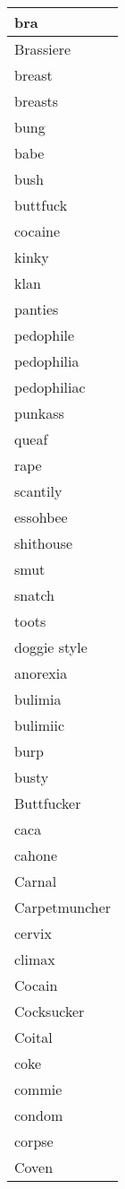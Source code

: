 \begin{longtable}{|l|}
bra \\ \hline 
Brassiere \\ \hline 
breast \\ \hline 
breasts \\ \hline 
bung \\ \hline 
babe \\ \hline 
bush \\ \hline 
buttfuck \\ \hline 
cocaine \\ \hline 
kinky \\ \hline 
klan \\ \hline 
panties \\ \hline 
pedophile \\ \hline 
pedophilia \\ \hline 
pedophiliac \\ \hline 
punkass \\ \hline 
queaf \\ \hline 
rape \\ \hline 
scantily \\ \hline 
essohbee \\ \hline 
shithouse \\ \hline 
smut \\ \hline 
snatch \\ \hline 
toots \\ \hline 
doggie style \\ \hline 
anorexia \\ \hline 
bulimia \\ \hline 
bulimiic \\ \hline 
burp \\ \hline 
busty \\ \hline 
Buttfucker \\ \hline 
caca \\ \hline 
cahone \\ \hline 
Carnal \\ \hline 
Carpetmuncher \\ \hline 
cervix \\ \hline 
climax \\ \hline 
Cocain \\ \hline 
Cocksucker \\ \hline 
Coital \\ \hline 
coke \\ \hline 
commie \\ \hline 
condom \\ \hline 
corpse \\ \hline 
Coven \\ \hline 

\end{longtable}
